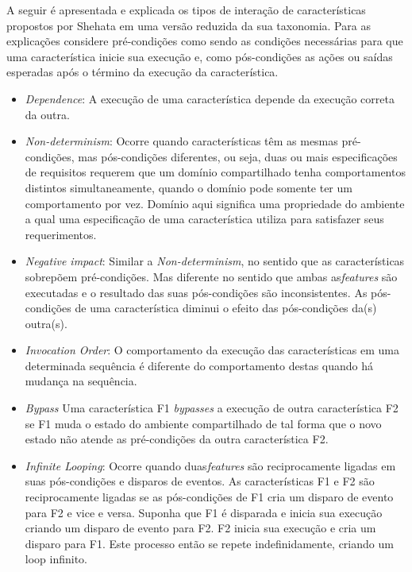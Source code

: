 A seguir é apresentada e explicada os tipos de interação de características propostos por Shehata em uma versão reduzida da sua taxonomia\cite{NHLABATSI:2008}. Para as explicações considere pré-condições como sendo as condições necessárias para que uma característica inicie sua execução e, como pós-condições as ações ou saídas esperadas após o término da execução da característica.

\begin{itemize}
\item \textit{Dependence}: A execução de uma característica depende da execução correta da outra.
\item \textit{Non-determinism}: Ocorre quando características têm as mesmas pré-condições, mas pós-condições diferentes, ou seja, duas ou mais especificações de requisitos requerem que um domínio compartilhado tenha comportamentos distintos simultaneamente, quando o domínio pode somente ter um comportamento por vez. Domínio aqui significa uma propriedade do ambiente a qual uma especificação de uma característica utiliza para satisfazer seus requerimentos. 
\item \textit{Negative impact}: Similar a \textit{Non-determinism}, no sentido que as características sobrepõem pré-condições. Mas diferente no sentido que ambas as\textit{features} são executadas e o resultado das suas pós-condições são inconsistentes. As pós-condições de uma característica diminui o efeito das pós-condições da(s) outra(s).
\item \textit{Invocation Order}: O comportamento da execução das características em uma determinada sequência é diferente do comportamento destas quando há mudança na sequência.
\item \textit{Bypass} Uma característica F1 \textit{bypasses} a execução de outra característica F2 se F1 muda o estado do ambiente compartilhado de tal forma que o novo estado não atende as pré-condições da outra característica F2.
\item \textit{Infinite Looping}: Ocorre quando duas\textit{features} são reciprocamente ligadas em suas pós-condições e disparos de eventos. As características F1 e F2 são reciprocamente ligadas se as pós-condições de F1 cria um disparo de evento para F2 e vice e versa. Suponha que F1 é disparada e inicia sua execução criando um disparo de evento para F2. F2 inicia sua execução e cria um disparo para F1. Este processo então se repete indefinidamente, criando um loop infinito.  
\end{itemize}

